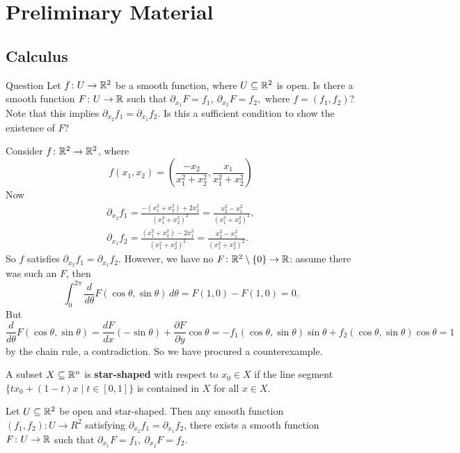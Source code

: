 \section{Preliminary Material}
\subsection{Calculus}
\begin{namedthing}{Question}
    Let $f \colon U \to \mathbb{R}^2$ be a smooth function, where $U \subseteq \mathbb{R}^2$ is open. Is there a smooth function $F \colon U \to \mathbb{R}$ such that $\partial _{x_1}F=f_1, \ \partial _{x_2}F=f_2,$ where $f=(f_1,f_2)$? Note that this implies $\partial _{x_2}f_1=\partial _{x_1}f_2$. Is this a sufficient condition to show the existence of $F$?
\end{namedthing}
\begin{example}
    Consider $f \colon \mathbb{R}^2 \to \mathbb{R}^2$, where \[
        f(x_1,x_2)= \left( \frac{-x_2}{x_1^2+x_2^2} , \frac{x_1}{x_1^2+x_2^2}\right) 
    \] Now  
    \begin{gather*}
        \partial _{x_2}f_1= \frac{-(x_1^2+x_2^2)+2x_2^2}{(x_1^2+x_2^2)^2}=\frac{x_2^2-x_1^2}{(x_1^2+x_2^2)^2},\\ 
        \partial _{x_1}f_2= \frac{(x_1^2+x_2^2)-2x_1^2}{(x_1^2+x_2^2)^2}=\frac{x_2^2-x_1^2}{(x_1^2+x_2^2)^2}.
    \end{gather*} So $f$ satisfies $\partial _{x_2}f_1=\partial _{x_1}f_2$. However, we have no $F \colon \mathbb{R}^2 \setminus \{0\} \to \mathbb{R}$: assume there was such an $F$, then \[
    \int_{0}^{2\pi } \frac{d}{d\theta}F(\cos \theta, \sin \theta) \, d\theta=F(1,0)-F(1,0)=0.
    \] But \[
    \frac{d}{d\theta}F( \cos \theta ,\sin  \theta)= \frac{dF}{dx}(-\sin \theta)+\frac{\partial F}{\partial y}\cos \theta=-f_1(\cos \theta, \sin \theta) \sin \theta+f_2 (\cos \theta, \sin \theta) \cos \theta=1
    \] by the chain rule, a contradiction. So we have procured a counterexample.
\end{example}
\begin{definition}
    A subset $X\subseteq \mathbb{R}^n $ is \textbf{star-shaped} with respect to $x_0\in X$ if the line segment $\{tx_0+(1-t)x\mid t \in [0,1]\} $ is contained in $X$ for all $x \in X$.
\end{definition}
\begin{theorem}
    Let $U \subseteq \mathbb{R}^2$ be open and star-shaped. Then any smooth function $(f_1,f_2) \colon U \to R^2$ satisfying $\partial _{x_2}f_1=\partial _{x_1}f_2$, there exists a smooth function $F \colon U \to \mathbb{R}$ such that $\partial _{x_1}F=f_1, \ \partial _{x_2}F=f_2$.
\end{theorem}
